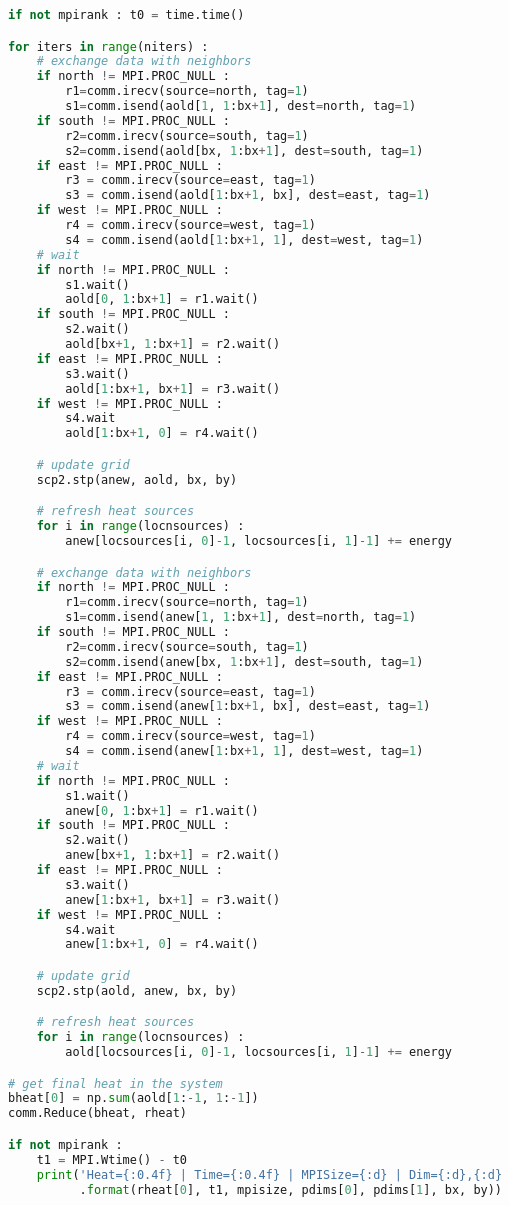 \begin{lstlisting}[language=Python, caption={Parallel Cython implementation of the stencil test case - Python main code.}]
if not mpirank : t0 = time.time()

for iters in range(niters) :
    # exchange data with neighbors
    if north != MPI.PROC_NULL :
        r1=comm.irecv(source=north, tag=1)
        s1=comm.isend(aold[1, 1:bx+1], dest=north, tag=1)
    if south != MPI.PROC_NULL :
        r2=comm.irecv(source=south, tag=1)
        s2=comm.isend(aold[bx, 1:bx+1], dest=south, tag=1)
    if east != MPI.PROC_NULL :
        r3 = comm.irecv(source=east, tag=1)
        s3 = comm.isend(aold[1:bx+1, bx], dest=east, tag=1)
    if west != MPI.PROC_NULL :
        r4 = comm.irecv(source=west, tag=1)
        s4 = comm.isend(aold[1:bx+1, 1], dest=west, tag=1)
    # wait
    if north != MPI.PROC_NULL :
        s1.wait()
        aold[0, 1:bx+1] = r1.wait()
    if south != MPI.PROC_NULL :
        s2.wait()
        aold[bx+1, 1:bx+1] = r2.wait()
    if east != MPI.PROC_NULL :
        s3.wait()
        aold[1:bx+1, bx+1] = r3.wait()
    if west != MPI.PROC_NULL :
        s4.wait
        aold[1:bx+1, 0] = r4.wait()

    # update grid
    scp2.stp(anew, aold, bx, by)

    # refresh heat sources
    for i in range(locnsources) :
        anew[locsources[i, 0]-1, locsources[i, 1]-1] += energy

    # exchange data with neighbors
    if north != MPI.PROC_NULL :
        r1=comm.irecv(source=north, tag=1)
        s1=comm.isend(anew[1, 1:bx+1], dest=north, tag=1)
    if south != MPI.PROC_NULL :
        r2=comm.irecv(source=south, tag=1)
        s2=comm.isend(anew[bx, 1:bx+1], dest=south, tag=1)
    if east != MPI.PROC_NULL :
        r3 = comm.irecv(source=east, tag=1)
        s3 = comm.isend(anew[1:bx+1, bx], dest=east, tag=1)
    if west != MPI.PROC_NULL :
        r4 = comm.irecv(source=west, tag=1)
        s4 = comm.isend(anew[1:bx+1, 1], dest=west, tag=1)
    # wait
    if north != MPI.PROC_NULL :
        s1.wait()
        anew[0, 1:bx+1] = r1.wait()
    if south != MPI.PROC_NULL :
        s2.wait()
        anew[bx+1, 1:bx+1] = r2.wait()
    if east != MPI.PROC_NULL :
        s3.wait()
        anew[1:bx+1, bx+1] = r3.wait()
    if west != MPI.PROC_NULL :
        s4.wait
        anew[1:bx+1, 0] = r4.wait()

    # update grid
    scp2.stp(aold, anew, bx, by)

    # refresh heat sources
    for i in range(locnsources) :
        aold[locsources[i, 0]-1, locsources[i, 1]-1] += energy 

# get final heat in the system
bheat[0] = np.sum(aold[1:-1, 1:-1])
comm.Reduce(bheat, rheat)

if not mpirank :
    t1 = MPI.Wtime() - t0
    print('Heat={:0.4f} | Time={:0.4f} | MPISize={:d} | Dim={:d},{:d} | bx,by={:d},{:d}'
          .format(rheat[0], t1, mpisize, pdims[0], pdims[1], bx, by))
\end{lstlisting}





